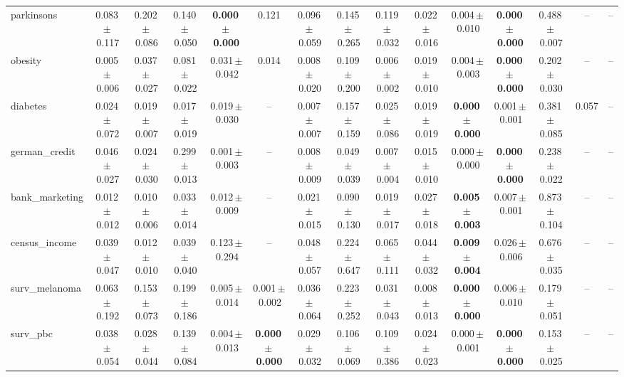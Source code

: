 \documentclass[8pt]{extarticle}
\begin{document}
\begin{longtable}{l*{14}{c}}
parkinsons & 0.083\,$\pm$\,0.117 & 0.202\,$\pm$\,0.086 & 0.140\,$\pm$\,0.050 & \textbf{0.000\,$\pm$\,0.000} & 0.121 & 0.096\,$\pm$\,0.059 & 0.145\,$\pm$\,0.265 & 0.119\,$\pm$\,0.032 & 0.022\,$\pm$\,0.016 & 0.004\,$\pm$\,0.010 & \textbf{0.000\,$\pm$\,0.000} & 0.488\,$\pm$\,0.007 & -- & -- \\
obesity & 0.005\,$\pm$\,0.006 & 0.037\,$\pm$\,0.027 & 0.081\,$\pm$\,0.022 & 0.031\,$\pm$\,0.042 & 0.014 & 0.008\,$\pm$\,0.020 & 0.109\,$\pm$\,0.200 & 0.006\,$\pm$\,0.002 & 0.019\,$\pm$\,0.010 & 0.004\,$\pm$\,0.003 & \textbf{0.000\,$\pm$\,0.000} & 0.202\,$\pm$\,0.030 & -- & -- \\
diabetes & 0.024\,$\pm$\,0.072 & 0.019\,$\pm$\,0.007 & 0.017\,$\pm$\,0.019 & 0.019\,$\pm$\,0.030 & -- & 0.007\,$\pm$\,0.007 & 0.157\,$\pm$\,0.159 & 0.025\,$\pm$\,0.086 & 0.019\,$\pm$\,0.019 & \textbf{0.000\,$\pm$\,0.000} & 0.001\,$\pm$\,0.001 & 0.381\,$\pm$\,0.085 & 0.057 & -- \\
german\_credit & 0.046\,$\pm$\,0.027 & 0.024\,$\pm$\,0.030 & 0.299\,$\pm$\,0.013 & 0.001\,$\pm$\,0.003 & -- & 0.008\,$\pm$\,0.009 & 0.049\,$\pm$\,0.039 & 0.007\,$\pm$\,0.004 & 0.015\,$\pm$\,0.010 & 0.000\,$\pm$\,0.000 & \textbf{0.000\,$\pm$\,0.000} & 0.238\,$\pm$\,0.022 & -- & -- \\
bank\_marketing & 0.012\,$\pm$\,0.012 & 0.010\,$\pm$\,0.006 & 0.033\,$\pm$\,0.014 & 0.012\,$\pm$\,0.009 & -- & 0.021\,$\pm$\,0.015 & 0.090\,$\pm$\,0.130 & 0.019\,$\pm$\,0.017 & 0.027\,$\pm$\,0.018 & \textbf{0.005\,$\pm$\,0.003} & 0.007\,$\pm$\,0.001 & 0.873\,$\pm$\,0.104 & -- & -- \\
census\_income & 0.039\,$\pm$\,0.047 & 0.012\,$\pm$\,0.010 & 0.039\,$\pm$\,0.040 & 0.123\,$\pm$\,0.294 & -- & 0.048\,$\pm$\,0.057 & 0.224\,$\pm$\,0.647 & 0.065\,$\pm$\,0.111 & 0.044\,$\pm$\,0.032 & \textbf{0.009\,$\pm$\,0.004} & 0.026\,$\pm$\,0.006 & 0.676\,$\pm$\,0.035 & -- & -- \\
surv\_melanoma & 0.063\,$\pm$\,0.192 & 0.153\,$\pm$\,0.073 & 0.199\,$\pm$\,0.186 & 0.005\,$\pm$\,0.014 & 0.001\,$\pm$\,0.002 & 0.036\,$\pm$\,0.064 & 0.223\,$\pm$\,0.252 & 0.031\,$\pm$\,0.043 & 0.008\,$\pm$\,0.013 & \textbf{0.000\,$\pm$\,0.000} & 0.006\,$\pm$\,0.010 & 0.179\,$\pm$\,0.051 & -- & -- \\
surv\_pbc & 0.038\,$\pm$\,0.054 & 0.028\,$\pm$\,0.044 & 0.139\,$\pm$\,0.084 & 0.004\,$\pm$\,0.013 & \textbf{0.000\,$\pm$\,0.000} & 0.029\,$\pm$\,0.032 & 0.106\,$\pm$\,0.069 & 0.109\,$\pm$\,0.386 & 0.024\,$\pm$\,0.023 & 0.000\,$\pm$\,0.001 & \textbf{0.000\,$\pm$\,0.000} & 0.153\,$\pm$\,0.025 & -- & -- \\

\end{longtable}
\end{document}
